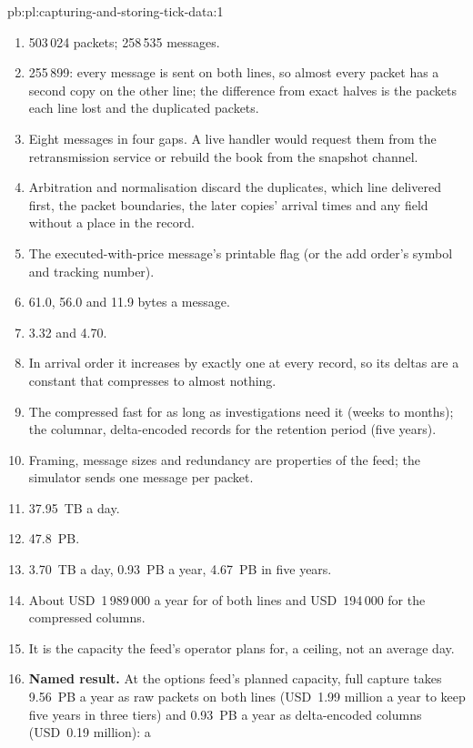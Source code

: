 \begin{solution}{pb:pl:capturing-and-storing-tick-data:1}
\begin{enumerate}
\item 503\,024 packets; 258\,535 messages.
\item 255\,899: every message is sent on both lines, so almost every packet has a second copy on the other line; the difference
from exact halves is the packets each line lost and the duplicated packets.
\item Eight messages in four gaps. A live handler would request them from the retransmission service or rebuild the book from
the snapshot channel.
\item Arbitration and normalisation discard the duplicates, which line delivered first, the packet boundaries, the later copies'
arrival times and any field without a place in the record.
\item The executed-with-price message's printable flag (or the add order's symbol and tracking number).
\item 61.0, 56.0 and 11.9 bytes a message.
\item 3.32 and 4.70.
\item In arrival order it increases by exactly one at every record, so its deltas are a constant that compresses to almost
nothing.
\item The  compressed fast for as long as investigations need it (weeks to months); the columnar, delta-encoded
records for the retention period (five years).
\item Framing, message sizes and redundancy are properties of the feed; the simulator sends one message per packet.
\item 37.95~TB a day.
\item 47.8~PB.
\item 3.70~TB a day, 0.93~PB a year, 4.67~PB in five years.
\item About USD~1\,989\,000 a year for  of both lines and USD~194\,000 for the compressed columns.
\item It is the capacity the feed's operator plans for, a ceiling, not an average day.
\item \textbf{Named result.} At the options feed's planned capacity, full capture takes 9.56~PB a year as raw packets on both lines
(USD~1.99 million a year to keep five years in three tiers) and 0.93~PB a year as delta-encoded columns (USD~0.19 million): a

\end{enumerate}
\end{solution}
